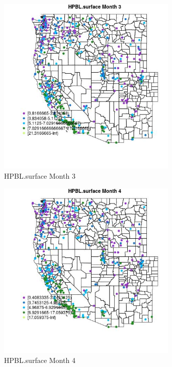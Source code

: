 \begin{figure} 
\centering  
\includegraphics[width=0.77\textwidth]{Code_Outputs/ML_input_report_ML_input_PM25_Step5_part_d_de_duplicated_aves_ML_input_MapObsMo3HPBLsurface.jpg} 
\caption{\label{fig:ML_input_report_ML_input_PM25_Step5_part_d_de_duplicated_aves_ML_inputMapObsMo3HPBLsurface}HPBL.surface Month 3} 
\end{figure} 
 

\begin{figure} 
\centering  
\includegraphics[width=0.77\textwidth]{Code_Outputs/ML_input_report_ML_input_PM25_Step5_part_d_de_duplicated_aves_ML_input_MapObsMo4HPBLsurface.jpg} 
\caption{\label{fig:ML_input_report_ML_input_PM25_Step5_part_d_de_duplicated_aves_ML_inputMapObsMo4HPBLsurface}HPBL.surface Month 4} 
\end{figure} 
 

